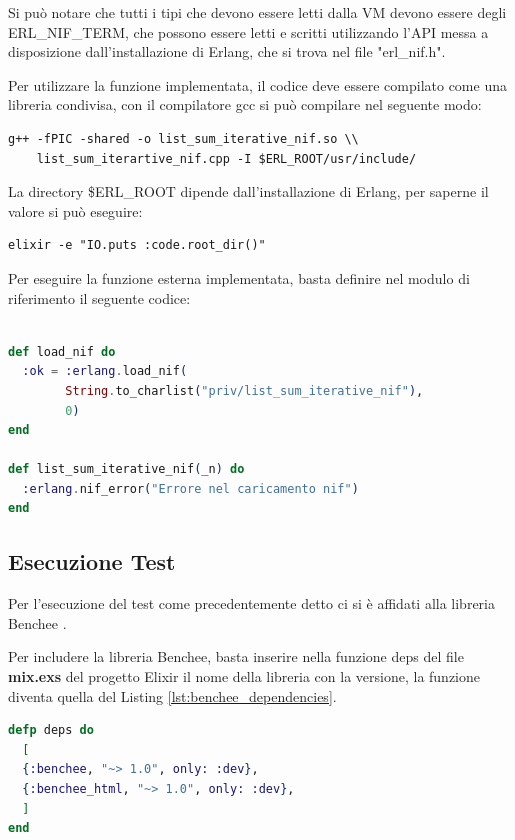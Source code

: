 Si può notare che tutti i tipi che devono essere letti
dalla VM devono essere degli ERL\_NIF\_TERM, che possono essere
letti e scritti utilizzando l'API messa a disposizione dall'installazione
di Erlang, che si trova nel file "erl\_nif.h".

Per utilizzare la funzione implementata, il codice deve essere compilato
come una libreria condivisa, con il compilatore gcc si può compilare
nel seguente modo:

\begin{lstlisting}[language=none]
g++ -fPIC -shared -o list_sum_iterative_nif.so \\
    list_sum_iterartive_nif.cpp -I $ERL_ROOT/usr/include/
\end{lstlisting}

La directory \$ERL\_ROOT dipende dall'installazione di Erlang,
per saperne il valore si può eseguire:
\begin{lstlisting}[language=none]
elixir -e "IO.puts :code.root_dir()"
\end{lstlisting}

Per eseguire la funzione esterna implementata, basta definire
nel modulo di riferimento il seguente codice:

\begin{lstlisting}[language=elixir,captionpos=b,
	caption={Funzione list\_sum\_port()},
	label={lst:listsumportelixir}]

def load_nif do
  :ok = :erlang.load_nif(
	    String.to_charlist("priv/list_sum_iterative_nif"),
		0)
end

def list_sum_iterative_nif(_n) do
  :erlang.nif_error("Errore nel caricamento nif")
end
\end{lstlisting}



\subsection{Esecuzione Test}

Per l'esecuzione del test come precedentemente detto
ci si è affidati alla libreria Benchee \cite{bencheeo54:online}.

Per includere la libreria Benchee, basta inserire nella funzione
deps del file \textbf{mix.exs} del progetto Elixir il nome
della libreria con la versione, la funzione diventa
quella del Listing \ref{lst:benchee_dependencies}.


\begin{lstlisting}[language=elixir,captionpos=b,
	caption={Dipendenze di Benchee},
	label={lst:benchee_dependencies}]
defp deps do
  [
  {:benchee, "~> 1.0", only: :dev},     
  {:benchee_html, "~> 1.0", only: :dev},
  ]
end
\end{lstlisting}

